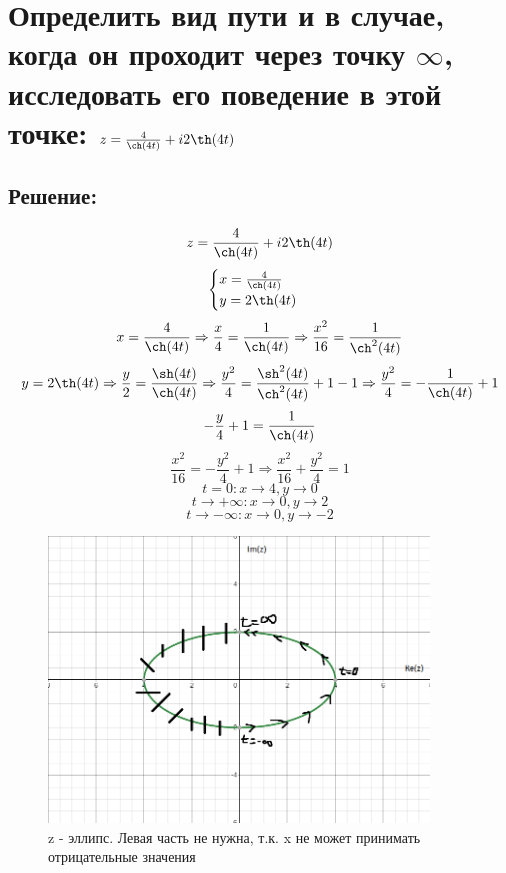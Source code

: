 \documentclass{article}
\begin{document}
	
	
	
	\section{Определить вид пути и в случае, когда он проходит через точку $\infty$, исследовать его поведение в этой точке: $z = \frac{4}{\ch(4t)} + i2\th(4t)$}
	\subsection{Решение:}
		\[z = \frac{4}{\ch(4t)} + i2\th(4t)\]
		\[\begin{cases}
		x = \frac{4}{\ch(4t)} \\
		y = 2 \th(4t)
		\end{cases}\]
		\[x= \frac{4}{\ch (4t)} \Rightarrow \frac{x}{4} = \frac{1}{\ch (4t)} \Rightarrow \frac{x^2}{16} = \frac{1}{\ch^2 (4t)}\]
		\[y = 2 \th(4t) \Rightarrow \frac{y}{2} = \frac{\sh(4t)}{\ch(4t)} \Rightarrow\frac{y^2}{4} = \frac{\sh^2(4t)}{\ch^2(4t)} + 1 -1 \Rightarrow\frac{y^2}{4} = -\frac{1}{\ch(4t)}+1\]
		\[-\frac{y}{4} + 1 = \frac{1}{\ch(4t)}\]
		\[\frac{x^2}{16} = -\frac{y^2}{4} + 1 \Rightarrow \frac{x^2}{16} + \frac{y^2}{4} = 1\]
		\[t =0 : x \rightarrow 4, y \rightarrow 0\]
		\[t \rightarrow +\infty : x \rightarrow 0, y \rightarrow 2\]
		\[t \rightarrow -\infty : x \rightarrow 0, y \rightarrow -2\]
		
	
	\begin{figure}[h]
		\centering
		\includegraphics[width= 0.9\textwidth]	{7.png}
		\caption{z - эллипс. Левая часть не нужна, т.к. x не может принимать отрицательные значения}
		\label{fig:your_label}
	\end{figure}
	
\end{document}
